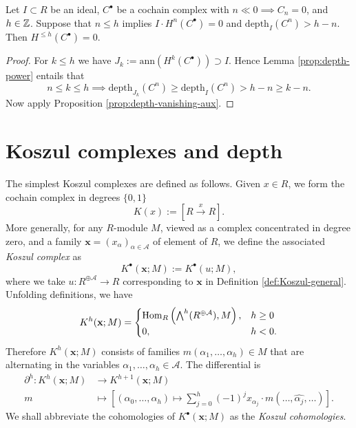 \begin{corollary}\label{prop:depth-vanishing}
	Let $I \subset R$ be an ideal, $C^\bullet$ be a cochain complex with $n \ll 0 \implies C_n=0$, and $h \in \mathbb{Z}$. Suppose that $n \leq h$ implies $I \cdot H^n(C^\bullet) = 0$ and $\mathrm{depth}_I(C^n) > h-n$. Then $H^{\leq h}(C^\bullet) = 0$.
\end{corollary}
\begin{proof}
	For $k \leq h$ we have $J_k := \text{ann}(H^k(C^\bullet)) \supset I$. Hence Lemma \ref{prop:depth-power} entails that
	\[ n \leq k \leq h \implies \text{depth}_{J_k}(C^n) \geq \text{depth}_I(C^n) > h-n \geq k-n. \]
	Now apply Proposition \ref{prop:depth-vanishing-aux}.
\end{proof}

\section{Koszul complexes and depth}
The simplest Koszul complexes are defined as follows. Given $x \in R$, we form the cochain complex in degrees $\{0,1\}$
\[ K(x) := \left[ R \xrightarrow{x} R \right]. \]
More generally, for any $R$-module $M$, viewed as a complex concentrated in degree zero, and a family $\mathbf{x} = (x_\alpha)_{\alpha \in \mathcal{A}}$ of element of $R$, we define the associated \emph{Koszul complex} as
\[ K^\bullet(\mathbf{x}; M) := K^\bullet(u; M), \]
where we take $u: R^{\oplus \mathcal{A}} \to R$ corresponding to $\mathbf{x}$ in Definition \ref{def:Koszul-general}. Unfolding definitions, we have 
\[ K^h(\mathbf{x}; M) = \begin{cases}
	\operatorname{Hom}_R\left( \bigwedge^h (R^{\oplus \mathcal{A}}), M \right), & h \geq 0 \\
	0, & h < 0. 
\end{cases} \]
Therefore $K^h(\mathbf{x}; M)$ consists of families $m(\alpha_1, \ldots, \alpha_h) \in M$ that are alternating in the variables $\alpha_1, \ldots, \alpha_h \in \mathcal{A}$. The differential is
\begin{align*}
	\partial^h: K^h(\mathbf{x}; M) & \longrightarrow K^{h+1}(\mathbf{x}; M) \\
	m & \longmapsto \left[ (\alpha_0, \ldots, \alpha_h) \mapsto \sum_{j=0}^h (-1)^j x_{\alpha_j} \cdot m(\ldots, \widehat{\alpha_j}, \ldots) \right].
\end{align*}
We shall abbreviate the cohomologies of $K^\bullet(\mathbf{x}; M)$ as the \emph{Koszul cohomologies}.

